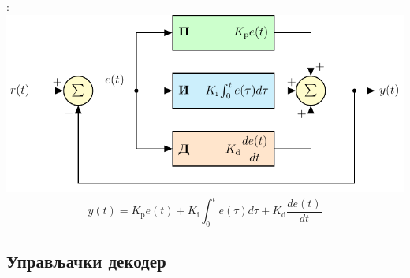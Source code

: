 \documentclass[aspectratio=169]{beamer}
\begin{document}
\begin{frame}{\secname: \subsecname}
	\centering
	\includegraphics[scale=0.8]{slike/prezentacija/pid.pdf}
	\begin{equation}
		y(t)= K_\text{p}e(t) + K_\text{i}\int_{0}^{t}e(\tau)d\tau + K_\text{d}\frac{de(t)}{dt} \nonumber
	\end{equation}
\end{frame}

\subsection{Управљачки декодер}
\end{document}
